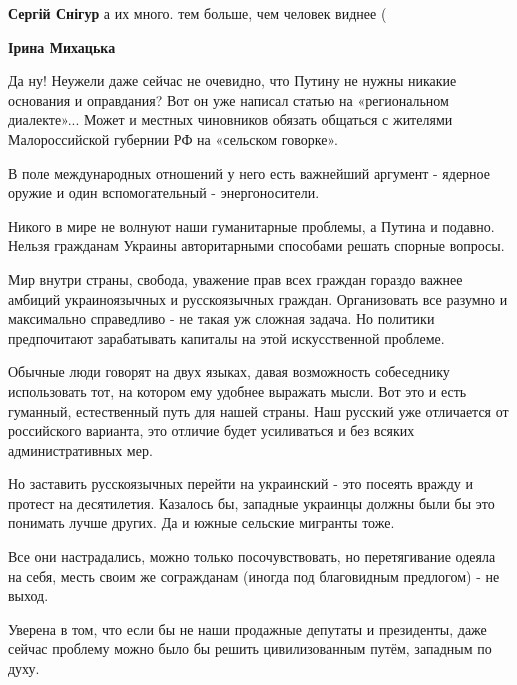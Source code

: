 \begin{itemize}
\begin{itemize}
 
\textbf{Сергій Снігур} а их много. тем больше, чем человек виднее (

 
\textbf{Ірина Михацька} 

Да ну! Неужели даже сейчас не очевидно, что Путину не нужны никакие основания и
оправдания? Вот он уже написал статью на «региональном диалекте»... Может и
местных чиновников обязать общаться с жителями Малороссийской губернии РФ на
«сельском говорке». 

В поле международных отношений у него есть важнейший аргумент - ядерное оружие
и один вспомогательный - энергоносители. 

Никого в мире не волнуют наши гуманитарные проблемы, а Путина и подавно. Нельзя
гражданам Украины авторитарными способами решать спорные вопросы. 

Мир внутри страны, свобода, уважение прав всех граждан гораздо важнее амбиций
украиноязычных и русскоязычных граждан. Организовать все разумно и максимально
справедливо - не такая уж сложная задача. Но политики предпочитают зарабатывать
капиталы на этой искусственной проблеме. 

Обычные люди говорят на двух языках, давая возможность собеседнику использовать
тот, на котором ему удобнее выражать мысли. Вот это и есть гуманный,
естественный путь для нашей страны. Наш русский уже отличается от российского
варианта, это отличие будет усиливаться и без всяких административных мер. 

Но заставить русскоязычных перейти на украинский - это посеять вражду и протест
на десятилетия. Казалось бы, западные украинцы должны были бы это понимать
лучше других. Да и южные сельские мигранты тоже.

Все они настрадались, можно только посочувствовать, но перетягивание одеяла на
себя, месть своим же согражданам (иногда под благовидным предлогом) - не выход.

Уверена в том, что если бы не наши продажные депутаты и президенты, даже сейчас
проблему можно было бы решить цивилизованным путём, западным по духу.


\end{itemize}
\end{itemize}

